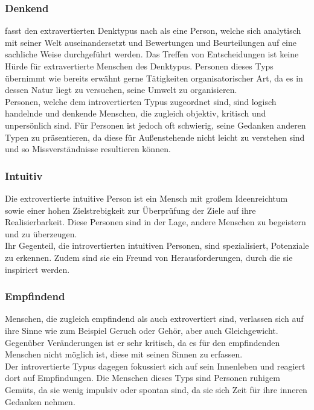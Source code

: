 \noindent
\cite{jung_2014}
\subsubsection{Denkend}
\citeauthor{jung_2014} fasst den extravertierten Denktypus nach \citeauthor{jung_1921} als eine Person, welche sich analytisch mit seiner Welt auseinandersetzt und Bewertungen und Beurteilungen auf eine sachliche Weise durchgeführt werden. Das Treffen von Entscheidungen ist keine Hürde für extravertierte Menschen des Denktypus. Personen dieses Typs übernimmt wie bereits erwähnt gerne Tätigkeiten organisatorischer Art, da es in dessen Natur liegt zu versuchen, seine Umwelt zu organisieren.\\
Personen, welche dem introvertierten Typus zugeordnet sind, sind logisch handelnde und denkende Menschen, die zugleich objektiv, kritisch und unpersönlich sind. Für Personen ist jedoch oft schwierig, seine Gedanken anderen Typen zu präsentieren, da diese für Außenstehende nicht leicht zu verstehen sind und so Missverständnisse resultieren können.


\noindent
\cite{jung_2014}
\subsubsection{Intuitiv}
Die extrovertierte intuitive Person ist ein Mensch mit großem Ideenreichtum sowie einer hohen Zielstrebigkeit zur Überprüfung der Ziele auf ihre Realisierbarkeit. Diese Personen sind in der Lage, andere Menschen zu begeistern und zu überzeugen.\\
Ihr Gegenteil, die introvertierten intuitiven Personen, sind spezialisiert, Potenziale zu erkennen. Zudem sind sie ein Freund von Herausforderungen, durch die sie inspiriert werden.


\noindent
\cite{jung_2014}

\subsubsection{Empfindend}
Menschen, die zugleich empfindend als auch extrovertiert sind, verlassen sich auf ihre Sinne wie zum Beispiel Geruch oder Gehör, aber auch Gleichgewicht. Gegenüber Veränderungen ist er sehr kritisch, da es für den empfindenden Menschen nicht möglich ist, diese mit seinen Sinnen zu erfassen.\\
Der introvertierte Typus dagegen fokussiert sich auf sein Innenleben und reagiert dort auf Empfindungen. Die Menschen dieses Typs sind Personen ruhigem Gemüts, da sie wenig impulsiv oder spontan sind, da sie sich Zeit für ihre inneren Gedanken nehmen.



